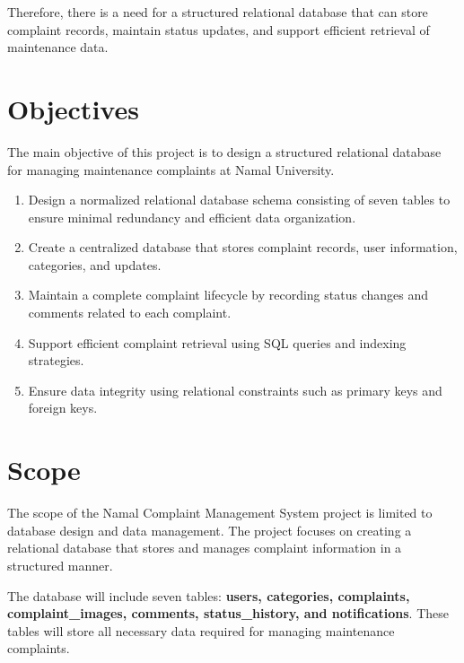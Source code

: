 \documentclass[12pt,a4paper]{article}
\begin{document}
Therefore, there is a need for a structured relational database that can store complaint records, maintain status updates, and support efficient retrieval of maintenance data.

\newpage


\section{Objectives}

The main objective of this project is to design a structured relational database for managing maintenance complaints at Namal University.

\begin{enumerate}

\item Design a normalized relational database schema consisting of seven tables to ensure minimal redundancy and efficient data organization.

\item Create a centralized database that stores complaint records, user information, categories, and updates.

\item Maintain a complete complaint lifecycle by recording status changes and comments related to each complaint.

\item Support efficient complaint retrieval using SQL queries and indexing strategies.

\item Ensure data integrity using relational constraints such as primary keys and foreign keys.

\end{enumerate}


\section{Scope}

The scope of the Namal Complaint Management System project is limited to database design and data management. The project focuses on creating a relational database that stores and manages complaint information in a structured manner.

The database will include seven tables: \textbf{users, categories, complaints, complaint\_images, comments, status\_history, and notifications}. These tables will store all necessary data required for managing maintenance complaints.
\end{document}
